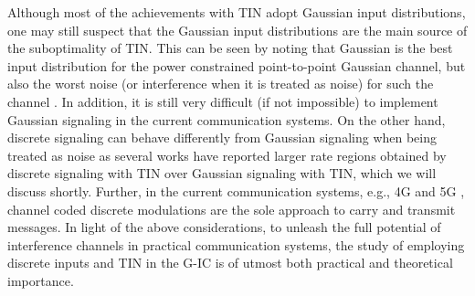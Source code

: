 \documentclass[12pt, draftclsnofoot, onecolumn]{IEEEtran}
\theoremstyle{definition}
\begin{document}
Although most of the achievements with TIN adopt Gaussian input distributions, one may still suspect that the Gaussian input distributions are the main source of the suboptimality of TIN. This can be seen by noting that Gaussian is the best input distribution for the power constrained point-to-point Gaussian channel, but also the worst noise (or interference when it is treated as noise) for such the channel \cite{Cover:2006:EIT:1146355}. In addition, it is still very difficult (if not impossible) to implement Gaussian signaling in the current communication systems. On the other hand, discrete signaling can behave differently from Gaussian signaling when being treated as noise as several works have reported larger rate regions obtained by discrete signaling with TIN over Gaussian signaling with TIN, which we will discuss shortly. Further, in the current communication systems, e.g., 4G \cite{TS136212} and 5G \cite{TS138212}, channel coded discrete modulations are the sole approach to carry and transmit messages. In light of the above considerations, to unleash the full potential of interference channels in practical communication systems, the study of employing discrete inputs and TIN in the G-IC is of utmost both practical and theoretical importance.
\end{document}
